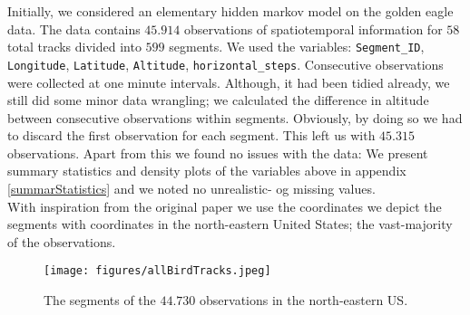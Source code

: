 Initially, we considered an elementary hidden markov model on the golden eagle data.\cite{eagleData} The data contains $45.914$ observations of spatiotemporal information for $58$ total tracks divided into $599$ segments. We used the variables: \texttt{Segment\_ID}, \texttt{Longitude}, \texttt{Latitude}, \texttt{Altitude}, \texttt{horizontal\_steps}. Consecutive observations were collected at one minute intervals. Although, it had been tidied already, we still did some minor data wrangling; we calculated the difference in altitude between consecutive observations within segments. Obviously, by doing so we had to discard the first observation for each segment. This left us with $45.315$ observations. Apart from this we found no issues with the data: We present summary statistics and density plots of the variables above in appendix \ref{summarStatistics} and we noted no unrealistic- og missing values.\\ With inspiration from the original paper \cite{Pirotta2018} we use the coordinates we depict the segments with coordinates in the north-eastern United States; the vast-majority of the observations.
\begin{figure}[h]
    \begin{center}
        \texttt{[image: figures/allBirdTracks.jpeg]}
        \caption{The segments of the $44.730$ observations in the north-eastern US.}
    \end{center}
\end{figure}
